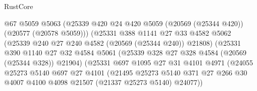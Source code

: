 \begin{lexlean}{RustCore}
\begin{coremodule}
                                    @67
                                    @5059
                                    @5063
                                    (@25339
                                      @420
                                      @24
                                      @420
                                      @5059
                                      (@20569 (@25344 @420))
                                      (@20577 (@20578 @5059)))
                                    (@25331
                                      @388
                                      @1141
                                      @27
                                      @33
                                      @4582
                                      @5062
                                      (@25339 @240 @27 @240 @4582 (@20569 (@25344 @240)) @21808)
                                      (@25331
                                        @390
                                        @1140
                                        @27
                                        @32
                                        @4584
                                        @5061
                                        (@25339 @328 @27 @328 @4584 (@20569 (@25344 @328)) @21904)
                                        (@25331
                                          @697
                                          @1095
                                          @27
                                          @31
                                          @4101
                                          @4971
                                          (@24055
                                            @25273
                                            @5140
                                            @697
                                            @27
                                            @4101
                                            (@21495
                                              @25273
                                              @5140
                                              @371
                                              @27
                                              @266
                                              @30
                                              @4007
                                              @4100
                                              @4098
                                              @21507
                                              (@21337 @25273 @5140)
                                              @24077))

\end{coremodule}
\end{lexlean}
